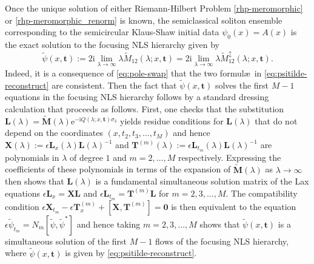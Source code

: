 \documentclass[12pt]{amsart}
\numberwithin{equation}{section}
\newcommand{\ee}{\mathrm{e}}
\newcommand{\ii}{\mathrm{i}}
\newcommand{\SP}{\lambda}
\def\eq{\begin{equation}}
\def\endeq{\end{equation}}
\begin{document}
Once the unique solution of either Riemann-Hilbert Problem \ref{rhp-meromorphic} or \ref{rhp-meromorphic_renorm} is known, the semiclassical soliton ensemble corresponding to the semicircular Klaus-Shaw initial data $\psi_0(x)=A(x)$ is the exact solution to 
the focusing NLS hierarchy given by 
\eq
\widetilde{\psi}(x,\mathbf{t}):=2\ii\lim_{\SP\to\infty}\SP\widetilde{M}_{12}(\SP;x,\mathbf{t}) = 2\ii\lim_{\SP\to\infty}\SP\widetilde{M}^\updownarrow_{12}(\SP;x,\mathbf{t}).
\label{eq:psitilde-reconstruct}
\endeq 
Indeed, it is a consequence of \eqref{eq:pole-swap} that the two formul\ae\ in \eqref{eq:psitilde-reconstruct} are consistent. Then the fact that $\widetilde{\psi}(x,\mathbf{t})$ solves the first $M-1$ equations in the focusing NLS hierarchy follows by a standard dressing calculation that proceeds as follows.  First, one checks that the substitution $\mathbf{L}(\SP)=\widetilde{\mathbf{M}}(\SP)\ee^{-\ii Q(\SP;x,\mathbf{t})\sigma_3}$ yields residue conditions for $\mathbf{L}(\SP)$ that do not depend on the coordinates $(x,t_2,t_3,\dots,t_M)$ and hence $\mathbf{X}(\SP):=\epsilon\mathbf{L}_x(\SP)\mathbf{L}(\SP)^{-1}$ and $\mathbf{T}^{(m)}(\SP):=\epsilon \mathbf{L}_{t_m}(\SP)\mathbf{L}(\SP)^{-1}$ are polynomials in $\SP$ of degree $1$ and $m=2,\dots,M$ respectively.  Expressing the coefficients of these polynomials in terms of the expansion of $\widetilde{\mathbf{M}}(\SP)$ as $\SP\to\infty$ then shows that $\mathbf{L}(\SP)$ is a fundamental simultaneous solution matrix of the Lax equations $\epsilon\mathbf{L}_x=\mathbf{XL}$ and $\epsilon\mathbf{L}_{t_m}=\mathbf{T}^{(m)}\mathbf{L}$ for $m=2,3,\dots,M$.  The compatibility condition $\epsilon\mathbf{X}_{t_m}-\epsilon\mathbf{T}^{(m)}_x + [\mathbf{X},\mathbf{T}^{(m)}]=\mathbf{0}$ is then equivalent to the equation $\epsilon\widetilde{\psi}_{t_m}=N_m[\widetilde{\psi},\widetilde{\psi}^*]$ and hence taking  $m=2,3,\dots,M$ shows that $\widetilde{\psi}(x,\mathbf{t})$ is a simultaneous solution of the first $M-1$ flows of the focusing NLS hierarchy, where $\widetilde{\psi}(x,\mathbf{t})$ is given by \eqref{eq:psitilde-reconstruct}.
\end{document}
